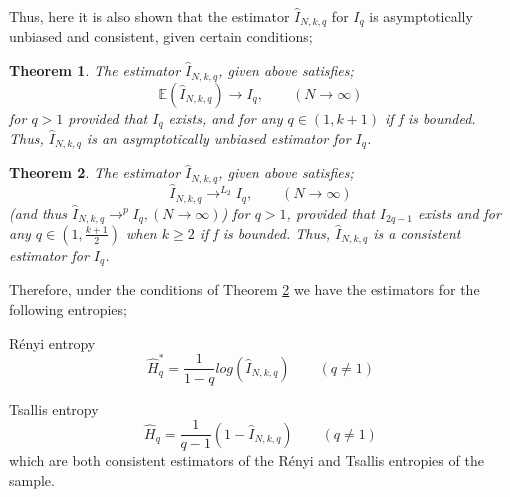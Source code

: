 \documentclass{article}
\newtheorem{theorem}{Theorem}
\begin{document}
Thus, here it is also shown that the estimator $\hat{I}_{N, k, q}$ for $I_{q}$ is asymptotically unbiased and consistent, given certain conditions;
\begin{theorem} \label{paper2_T1}
The estimator $\hat{I}_{N, k, q}$, given above satisfies;
\begin{equation}
\mathbb{E} (\hat{I}_{N, k, q}) \to I_{q}, \quad \quad (N \to \infty)
\end{equation}
for $q > 1$ provided that $I_{q}$ exists, and for any $q \in (1, k+1)$ if f is bounded.
Thus, $\hat{I}_{N, k, q}$ is an asymptotically unbiased estimator for $I_{q}$.
\end{theorem}

\begin{theorem} \label{paper2_T2}
The estimator $\hat{I}_{N, k, q}$, given above satisfies;
\begin{equation}
\hat{I}_{N, k, q} \to^{L_{2}} I_{q}, \quad \quad (N \to \infty)
\end{equation}
(and thus $\hat{I}_{N, k, q} \to^{p} I_{q},  (N \to \infty)$) for $q>1$, provided that $I_{2q-1}$ exists and for any $q \in (1, \frac{k+1}{2})$ when $ k \geq 2$ if f is bounded.
Thus, $\hat{I}_{N, k, q}$ is a consistent estimator for $I_{q}$.
\end{theorem}

Therefore, under the conditions of Theorem \ref{paper2_T2} we have the estimators for the following entropies;

R\'enyi entropy
\begin{equation}
\hat{H}_{q}^{*} = \frac{1}{1-q} log(\hat{I}_{N, k, q}) \quad  \quad (q \neq 1) \label{RenEnt} 
\end{equation}

Tsallis entropy
\begin{equation}
\hat{H}_{q} = \frac{1}{q-1} (1 - \hat{I}_{N, k, q}) \quad  \quad (q \neq 1) \label{TsaEnt} 
\end{equation}
which are both consistent estimators of the R\'enyi and Tsallis entropies of the sample.
\end{document}
